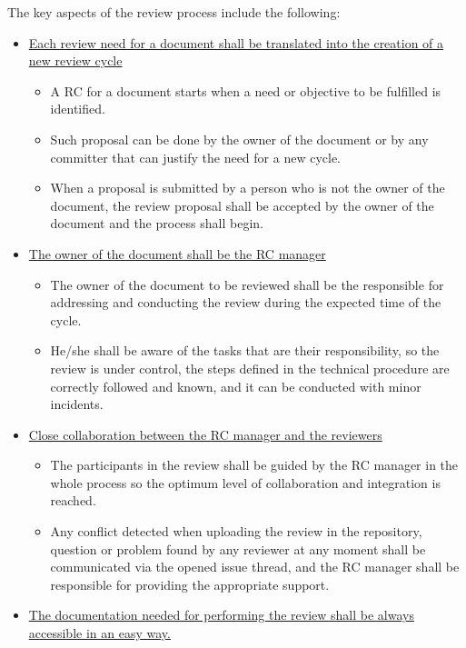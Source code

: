 \documentclass{template/openetcs_article}
\begin{document}
The key aspects of the review process include the following:

\begin{itemize}
\item \underline{Each review need for a document shall be translated into the creation of a new review cycle}
\begin{itemize}
\item A RC for a document starts when a need or objective to be fulfilled is identified.
\item Such proposal can be done by the owner of the document or by any committer that can justify the need for a new cycle. 
\item When a proposal is submitted by a person who is not the owner of the document, the review proposal shall be accepted by the owner of the document and the process shall begin.
\end{itemize}
\item \underline{The owner of the document shall be the RC manager}
\begin{itemize}
\item The owner of the document to be reviewed shall be the responsible for addressing and conducting the review during the expected time of the cycle. 
\item He/she shall be aware of the tasks that are their responsibility, so the review is under control, the steps defined in the technical procedure are correctly followed and known, and it can be conducted with minor incidents. 
\end{itemize}

\item \underline{Close collaboration between the RC manager and the reviewers}
\begin{itemize}
\item The participants in the review shall be guided by the RC manager in the whole process so the optimum level of collaboration and integration is reached. 
\item Any conflict detected when uploading the review in the repository, question or problem found by any reviewer at any moment shall be communicated via the opened issue thread, and the RC manager shall be responsible for providing the appropriate support.
\end{itemize}

\item \underline{The documentation needed for performing the review shall be always accessible in an easy way.}


\end{itemize}
\end{document}
